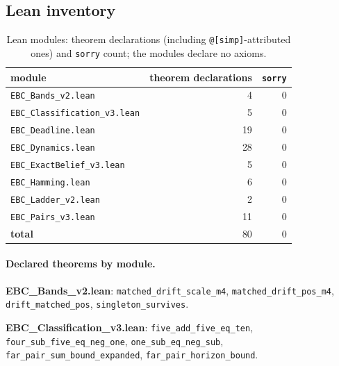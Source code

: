 \documentclass[11pt,a4paper]{article}
\theoremstyle{plain}
\theoremstyle{definition}
\theoremstyle{remark}
\begin{document}
\subsection{Lean inventory}
\begin{table}[H]\centering\small
\caption{Lean modules: theorem declarations (including \texttt{@[simp]}-attributed ones) and \texttt{sorry} count; the modules declare no axioms.}\label{tab:S8lean}
\begin{tabular}{lrr}
\toprule
module & theorem declarations & \texttt{sorry}\\
\midrule
\texttt{EBC\_Bands\_v2.lean} & 4 & 0\\
\texttt{EBC\_Classification\_v3.lean} & 5 & 0\\
\texttt{EBC\_Deadline.lean} & 19 & 0\\
\texttt{EBC\_Dynamics.lean} & 28 & 0\\
\texttt{EBC\_ExactBelief\_v3.lean} & 5 & 0\\
\texttt{EBC\_Hamming.lean} & 6 & 0\\
\texttt{EBC\_Ladder\_v2.lean} & 2 & 0\\
\texttt{EBC\_Pairs\_v3.lean} & 11 & 0\\
\textbf{total} & 80 & 0\\
\bottomrule
\end{tabular}
\end{table}
\paragraph{Declared theorems by module.}
\footnotesize
\textbf{EBC\_Bands\_v2.lean}: \texttt{matched\_\allowbreak{}drift\_\allowbreak{}scale\_\allowbreak{}m4}, \texttt{matched\_\allowbreak{}drift\_\allowbreak{}pos\_\allowbreak{}m4}, \texttt{drift\_\allowbreak{}matched\_\allowbreak{}pos}, \texttt{singleton\_\allowbreak{}survives}.

\textbf{EBC\_Classification\_v3.lean}: \texttt{five\_\allowbreak{}add\_\allowbreak{}five\_\allowbreak{}eq\_\allowbreak{}ten}, \texttt{four\_\allowbreak{}sub\_\allowbreak{}five\_\allowbreak{}eq\_\allowbreak{}neg\_\allowbreak{}one}, \texttt{one\_\allowbreak{}sub\_\allowbreak{}eq\_\allowbreak{}neg\_\allowbreak{}sub}, \texttt{far\_\allowbreak{}pair\_\allowbreak{}sum\_\allowbreak{}bound\_\allowbreak{}expanded}, \texttt{far\_\allowbreak{}pair\_\allowbreak{}horizon\_\allowbreak{}bound}.
\end{document}
